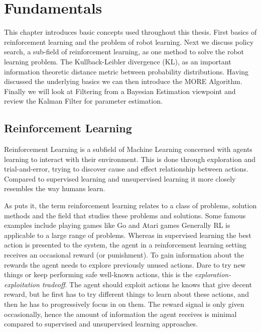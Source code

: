 
\chapter{Fundamentals}
This chapter introduces basic concepts used throughout this thesis.
First basics of reinforcement learning and the problem of robot learning.
Next we discuss policy search, a sub-field of reinforcement learning,
as one method to solve the robot learning problem.
The Kullback-Leibler divergence (KL), as an important information theoretic
distance metric between probability distributions.
Having discussed the underlying basics we can then
introduce the MORE Algorithm.
Finally we will look at Filtering from a Bayesian Estimation viewpoint and
review the Kalman Filter for parameter estimation.


\section{Reinforcement Learning}
Reinforcement Learning is a subfield of Machine Learning concerned with agents
learning to interact with their environment.
This is done through exploration and trial-and-error, trying to discover
cause and effect relationship between actions.
Compared to supervised learning and unsupervised learning it
more closely resembles the way humans learn.

As \citet{sutton2018reinforcement} puts it,
the term reinforcement learning relates to a class of problems,
solution methods and the field that studies these problems and solutions.
Some famous examples include playing games like Go
\citet{silver2016mastering} and Atari games \citet{mnih2013playing}
Generally RL is applicable to a large range of problems.
Whereas in supervised learning the best action is presented to the system,
the agent in a reinforcement learning setting receives an occasional
reward (or punishment).
To gain information about the rewards the agent needs
to explore previously unused actions.
Dare to try new things or keep performing safe
well-known actions, this is the \textit{exploration-exploitation tradeoff}.
The agent should exploit actions he knows that
give decent reward, but he first
has to try different things to learn about these actions,
and then he has to progressively focus in on them.
The reward signal is only given occasionally, hence the amount of information
the agent receives is minimal compared to
supervised and unsupervised learning approaches.

